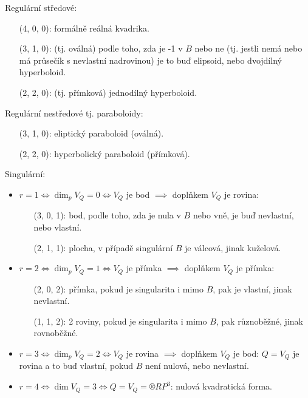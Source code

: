 \documentclass[12pt]{article}					%
\begin{document}
\begin{poznamka}
	Regulární středové:
	\begin{itemize}
		\item[(4, 0, 0):] formálně reálná kvadrika.
		\item[(3, 1, 0):] (tj. oválná) podle toho, zda je -1 v $B$ nebo ne (tj. jestli nemá nebo má průsečík s nevlastní nadrovinou) je to buď elipsoid, nebo dvojdílný hyperboloid.
		\item[(2, 2, 0):] (tj. přímková) jednodílný hyperboloid.
	\end{itemize}
	Regulární nestředové tj. paraboloidy:
	\begin{itemize}
		\item[(3, 1, 0):] eliptický paraboloid (oválná).
		\item[(2, 2, 0):] hyperbolický paraboloid (přímková).
	\end{itemize}
	Singulární:
	\begin{itemize}
		\item $r = 1 \Leftrightarrow \dim_p V_Q = 0 \Leftrightarrow V_Q$ je bod $\implies$ doplňkem $V_Q$ je rovina:
			\begin{itemize}
				\item[(3, 0, 1):] bod, podle toho, zda je nula v $B$ nebo vně, je buď nevlastní, nebo vlastní.
				\item[(2, 1, 1):] plocha, v případě singulární $B$ je válcová, jinak kuželová.
			\end{itemize}
		\item $r = 2 \Leftrightarrow \dim_p V_Q = 1 \Leftrightarrow V_Q$ je přímka $\implies$ doplňkem $V_Q$ je přímka:
			\begin{itemize}
				\item[(2, 0, 2):] přímka, pokud je singularita i mimo $B$, pak je vlastní, jinak nevlastní.
				\item[(1, 1, 2):] 2 roviny, pokud je singularita i mimo $B$, pak různoběžné, jinak rovnoběžné.
			\end{itemize}
		\item $r = 3 \Leftrightarrow \dim_p V_Q = 2 \Leftrightarrow V_Q$ je rovina $\implies$ doplňkem $V_Q$ je bod: $Q = V_Q$ je rovina a to buď vlastní, pokud $B$ není nulová, nebo nevlastní.
		\item $r = 4 \Leftrightarrow \dim V_Q = 3 \Leftrightarrow Q = V_Q = ®RP^3$: nulová kvadratická forma.
	\end{itemize}
\end{poznamka}
\end{document}
